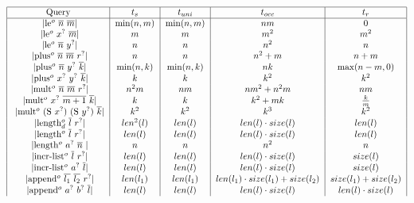 \begin{figure}[t]
      \[ \begin{tabular}{|c|c|c|c|c|}
           \hline
           Query & $t_s$ & $t_{uni}$ & $t_{occ}$ & $t_r$  \\
           \hline
           \lstinline|le$^o$ $\overline{n}$ $\overline{m}$| & $\min(n, m)$ & $\min(n, m)$ & $nm$ & $0$  \\
           \lstinline|le$^o$ $x^?$ $\overline{m}$| & $m$ & $m$ & $m^2$ & $m^2$  \\
           \lstinline|le$^o$ $\overline{n}$ $y^?$| & $n$ & $n$ & $n^2$ & $n$  \\
           \lstinline|plus$^o$ $\overline{n}$ $\overline{m}$ $r^?$| & $n$ & $n$ & $n^2 + m$ & $n + m$  \\
           \lstinline|plus$^o$ $\overline{n}$ $y^?$ $\overline{k}$| & $\min(n, k)$ & $\min(n, k)$ & $nk$ & $\max(n - m, 0)$  \\
           \lstinline|plus$^o$ $x^?$ $y^?$ $\overline{k}$| & $k$ & $k$ & $k^2$ & $k^2$  \\
           \lstinline|mult$^o$ $\overline{n}$ $\overline{m}$ $r^?$| & $n^2 m$ & $n m$ & $n m^2 + n^2 m$ & $n m$  \\
           \lstinline|mult$^o$ $x^?$ $\overline{m + 1}$ $\overline{k}$| & $k$ & $k$ & $k^2 + mk$ & $\frac{k}{m}$  \\
           \lstinline|mult$^o$ (S $ x^?$) (S $y^?$) $\overline{k}$| & $k^2$ & $k^2$ & $k^3$ & $k^2$  \\
           \lstinline|length$_d^o$ $\overline{l}$ $r^?$| & $len^2(l)$ & $len(l)$ & $len(l) \cdot size(l)$ & $len(l)$  \\
           \lstinline|length$^o$ $\overline{l}$ $r^?$| & $len(l)$ & $len(l)$ & $len(l) \cdot size(l)$ & $len(l)$  \\
           \lstinline|length$^o$ $a^?$ $\overline{n}$ | & $n$ & $n$ & $n^2$ & $n$  \\
           \lstinline|incr-list$^o$ $\overline{l}$ $r^?$| & $len(l)$ & $len(l)$ & $len(l) \cdot size(l)$ & $size(l)$  \\
           \lstinline|incr-list$^o$ $a^?$ $\overline{l}$| & $len(l)$ & $len(l)$ & $len(l) \cdot size(l)$ & $size(l)$  \\
           \lstinline|append$^o$ $\overline{l_1}$ $\overline{l_2}$ $r^?$| & $len(l_1)$ & $len(l_1)$ & $len(l_1) \cdot size(l_1) + size(l_2)$ & $size(l_1) + size(l_2)$  \\
           \lstinline|append$^o$ $a^?$ $b^?$ $\overline{l}$| & $len(l)$ & $len(l)$ & $len(l) \cdot size(l)$ & $len(l) \cdot size(l)$  \\

\end{tabular}\]
\end{figure}
